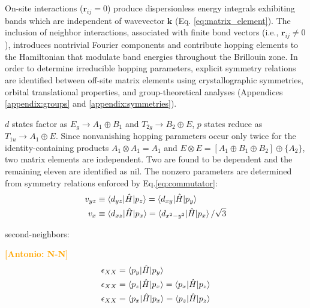 \documentclass[twocolumn,showpacs,preprintnumbers,superscriptaddress,prb,floatfix,aps,10pt]{revtex4-1}
\newcommand{\abmei}[1]{\textcolor{orange}{ \bf [Antonio: #1] }}
\renewcommand{\vec}[1]{\ensuremath{\mathbf{#1}}}
\newcommand*{\ham}{\hat{H}}
\begin{document}
On-site interactions ($\vec{r}_{ij} = 0$) produce dispersionless energy integrals exhibiting bands which are independent of wavevector $\vec{k}$ (Eq. \ref{eq:matrix_element}). The inclusion of neighbor interactions, associated with finite bond vectors (i.e., $\vec{r}_{ij} \neq 0$), introduces nontrivial Fourier components and contribute hopping elements to the Hamiltonian that modulate band energies throughout the Brillouin zone. In order to determine irreducible hopping parameters, explicit symmetry relations are identified between off-site matrix elements using crystallographic symmetries, orbital translational properties, and group-theoretical analyses (Appendices \ref{appendix:groups} and \ref{appendix:symmetries}). 













$d$ states factor as $E_g \rightarrow A_1 \oplus B_1$ and $T_{2g} \rightarrow B_2 \oplus E$, $p$ states reduce as $T_{1u} \rightarrow A_1 \oplus E$. Since nonvanishing hopping parameters occur only twice for the identity-containing products $A_1 \otimes A_1 = A_1$ and $E \otimes E = [ A_1 \oplus B_1 \oplus B_2 ] \oplus \{ A_2 \}$, two matrix elements are independent. Two are found to be dependent and the remaining eleven are identified as nil. The nonzero parameters are determined from symmetry relations enforced by Eq.\ref{eq:commutator}:
%
\begin{align}
v_{yz} &
\equiv \braket{d_{yz} | \ham | p_z} 
= \braket{d_{xy} | \ham | p_y} \\
v_{x} &
\equiv \braket{d_{xz} | \ham | p_x} 
= \braket{d_{x^2-y^2} | \ham | p_x} / \sqrt{3}
\end{align}




second-neighbors:

\abmei{N-N}
\begin{align}
\epsilon_{XX} &
= \braket{p_{y} | \ham | p_y } \\
\epsilon_{XX} &
= \braket{p_{z} | \ham | p_x }
= \braket{p_{x} | \ham | p_z } \\
\epsilon_{XX} &
= \braket{p_{x} | \ham | p_x }
= \braket{p_{z} | \ham | p_z } \\
\end{align}
\end{document}
